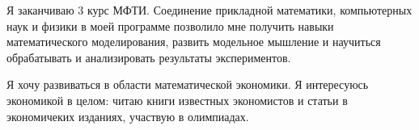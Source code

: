 Я заканчиваю 3 курс МФТИ. 
Соединение прикладной математики, компьютерных наук и физики в моей программе позволило мне получить навыки математического моделирования, 
развить модельное мышление и научиться обрабатывать и анализировать результаты экспериментов. 

Я хочу развиваться в области математической экономики.
Я интересуюсь экономикой в целом: читаю книги известных экономистов и статьи в экономичеких изданиях, 
участвую в олимпиадах.

